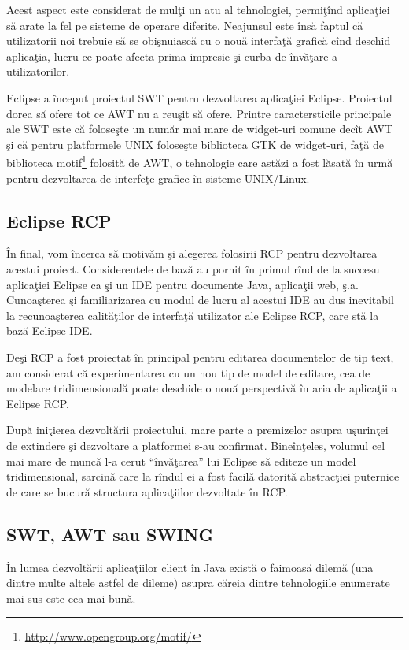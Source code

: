 Acest aspect este considerat de mulţi un atu al tehnologiei, permiţînd 
aplicaţiei să arate la fel pe sisteme de operare diferite. Neajunsul este însă 
faptul că utilizatorii noi trebuie să se obişnuiască cu o nouă interfaţă 
grafică cînd deschid aplicaţia, lucru ce poate afecta prima impresie şi curba 
de învăţare a utilizatorilor.

Eclipse a început proiectul SWT pentru dezvoltarea aplicaţiei Eclipse. 
Proiectul dorea să ofere tot ce AWT nu a reuşit să ofere. Printre 
caractersticile principale ale SWT este că foloseşte un număr mai mare de 
widget-uri comune decît AWT şi că pentru platformele UNIX foloseşte biblioteca 
GTK de widget-uri, faţă de biblioteca 
motif\footnote{\url{http://www.opengroup.org/motif/}} folosită de AWT, o 
tehnologie care astăzi a fost lăsată în urmă pentru dezvoltarea de interfeţe 
grafice în sisteme UNIX/Linux.
\subsection{Eclipse RCP}

În final, vom încerca să motivăm şi alegerea folosirii RCP pentru dezvoltarea 
acestui proiect. Considerentele de bază au pornit în primul rînd de la succesul 
aplicaţiei Eclipse ca şi un IDE pentru documente Java, aplicaţii web, ş.a. 
Cunoaşterea şi familiarizarea cu modul de lucru al acestui IDE au dus 
inevitabil la recunoaşterea calităţilor de interfaţă utilizator ale Eclipse 
RCP, care stă la bază Eclipse IDE.

Deşi RCP a fost proiectat în principal pentru editarea documentelor de tip 
text, am considerat că experimentarea cu un nou tip de model de editare, cea de 
modelare tridimensională poate deschide o nouă perspectivă în aria de aplicaţii 
a Eclipse RCP.

După iniţierea dezvoltării proiectului, mare parte a premizelor asupra 
uşurinţei de extindere şi dezvoltare a platformei s-au confirmat. Bineînţeles, 
volumul cel mai mare de muncă l-a cerut ``învăţarea'' lui Eclipse să editeze un 
model tridimensional, sarcină care la rîndul ei a fost facilă datorită 
abstracţiei puternice de care se bucură structura aplicaţiilor dezvoltate în 
RCP.

\subsection{SWT, AWT sau SWING}

În lumea dezvoltării aplicaţiilor client în Java există o faimoasă dilemă (una
dintre multe altele astfel de dileme) asupra căreia dintre tehnologiile
enumerate mai sus este cea mai bună.

